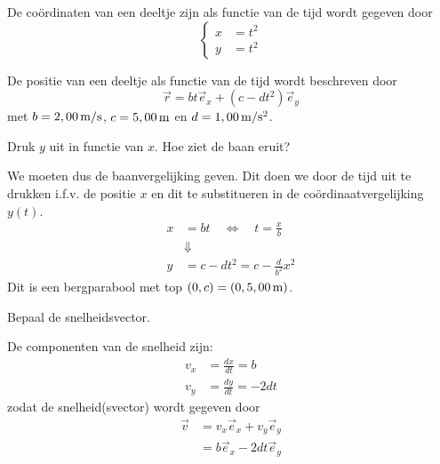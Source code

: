 \documentclass{ximera}
\begin{document}
\begin{exercise}
De coördinaten van een deeltje zijn als functie van de tijd wordt gegeven door
\[
\left\{
\begin{aligned}
	x&=t^2 \\
	y&=t^2
\end{aligned}
\right.
\]

\begin{multipleChoice}
\end{multipleChoice}
\end{exercise}

\begin{exercise}
	De positie van een deeltje als functie van de tijd wordt beschreven door
	\[
	\vec{r}=bt\vec{e}_x+(c-dt^2)\vec{e}_y
	\]
	met $b=2,00\rm\,m/s$, $c=5,00\rm\,m$ en $d=1,00\rm\,m/s^2$.
	
	\begin{question}
	Druk $y$ uit in functie van $x$. Hoe ziet de baan eruit?
	
	\begin{oplossing}
	We moeten dus de baanvergelijking geven. 
	Dit doen we door de tijd uit te drukken i.f.v. de positie $x$ en dit te substitueren in de coördinaatvergelijking $y(t)$.
	\begin{align*}
	x&=bt \quad \Leftrightarrow \quad t=\frac{x}{b}\\
	&\Downarrow\\
	y&=c-dt^2=c-\frac{d}{b^2}x^2
	\end{align*}
	Dit is een bergparabool met top $(0,c)=(0,5,00\rm\,m)$.
	\end{oplossing}
	\end{question}
	
	\begin{question}
	Bepaal de snelheidsvector.
	
	\begin{oplossing}
	De componenten van de snelheid zijn:
	\begin{align*}
	v_x&=\frac{dx}{dt}=b\\
	v_y&=\frac{dy}{dt}=-2dt
	\end{align*}
	zodat de snelheid(svector) wordt gegeven door
	\begin{align*}
	\vec{v}&=v_x\vec{e}_x+v_y\vec{e}_y\\
	&=b\vec{e}_x-2dt\vec{e}_y
	\end{align*}
	\end{oplossing}
	\end{question}
	

\end{exercise}
\end{document}
